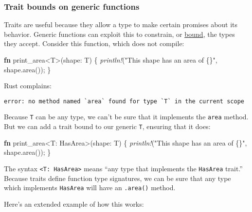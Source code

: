 \documentclass[a4paper,]{book}
\newenvironment{Shaded}{\begin{snugshade}}{\end{snugshade}}
\newcommand{\KeywordTok}[1]{\textcolor[rgb]{0.13,0.29,0.53}{\textbf{{#1}}}}
\newcommand{\StringTok}[1]{\textcolor[rgb]{0.31,0.60,0.02}{{#1}}}
\newcommand{\PreprocessorTok}[1]{\textcolor[rgb]{0.56,0.35,0.01}{\textit{{#1}}}}
\newcommand{\NormalTok}[1]{{#1}}
\begin{document}
\subsubsection{Trait bounds on generic
functions}\label{trait-bounds-on-generic-functions}

Traits are useful because they allow a type to make certain promises
about its behavior. Generic functions can exploit this to constrain, or
\protect\hyperlink{bounds}{bound}, the types they accept. Consider this
function, which does not compile:

\begin{Shaded}
\begin{Highlighting}[]
\KeywordTok{fn} \NormalTok{print_area<T>(shape: T) \{}
    \PreprocessorTok{println!}\NormalTok{(}\StringTok{"This shape has an area of \{\}"}\NormalTok{, shape.area());}
\NormalTok{\}}
\end{Highlighting}
\end{Shaded}

Rust complains:

\begin{verbatim}
error: no method named `area` found for type `T` in the current scope
\end{verbatim}

Because \texttt{T} can be any type, we can't be sure that it implements
the \texttt{area} method. But we can add a trait bound to our generic
\texttt{T}, ensuring that it does:

\begin{Shaded}
\begin{Highlighting}[]
\KeywordTok{fn} \NormalTok{print_area<T: HasArea>(shape: T) \{}
    \PreprocessorTok{println!}\NormalTok{(}\StringTok{"This shape has an area of \{\}"}\NormalTok{, shape.area());}
\NormalTok{\}}
\end{Highlighting}
\end{Shaded}

The syntax \texttt{\textless{}T:\ HasArea\textgreater{}} means ``any
type that implements the \texttt{HasArea} trait.'' Because traits define
function type signatures, we can be sure that any type which implements
\texttt{HasArea} will have an \texttt{.area()} method.

Here's an extended example of how this works:
\end{document}
